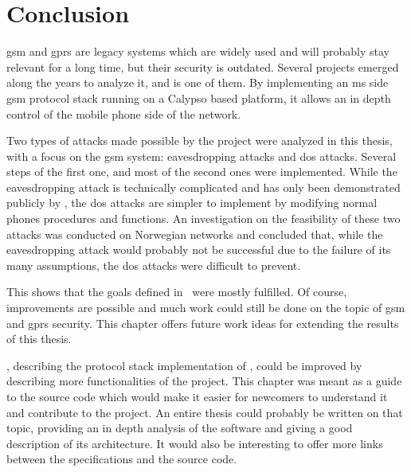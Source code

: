\chapter{Conclusion} \label{chap:conclusion}

  \gls{gsm} and \gls{gprs} are legacy systems which are widely used and
  will probably stay relevant for a long time, but their security is
  outdated. Several projects emerged along the years to analyze it, and
   is one of them. By implementing an \gls{ms} side
  \gls{gsm} protocol stack running on a Calypso based platform, it
  allows an in depth control of the mobile phone side of the network. 

  Two types of attacks made possible by the  project
  were analyzed in this thesis, with a focus on the \gls{gsm} system:
  eavesdropping attacks and \gls{dos} attacks. Several steps of the
  first one, and most of the second ones were implemented. While the
  eavesdropping attack is technically complicated and has only been
  demonstrated publicly by , the \gls{dos} attacks
  are simpler to implement by modifying normal phones procedures and
  functions. An investigation on the feasibility of these two attacks
  was conducted on Norwegian networks and concluded that, while the
  eavesdropping attack would probably not be successful due to the
  failure of its many
  assumptions, the \gls{dos} attacks were difficult to prevent.

  This shows that the goals defined in~ were mostly
  fulfilled. Of course, improvements are possible and much work
  could still be done on the topic of \gls{gsm} and \gls{gprs}
  security. This chapter offers future work ideas for extending the
  results of this thesis.

  , describing the protocol
  stack implementation of , could be improved by
  describing more functionalities of the project. This chapter was meant
  as a guide to the source code which would make it easier for newcomers
  to understand it and contribute to the project. An entire thesis could
  probably be written on that topic, providing an in depth analysis of
  the software and giving a good description of its architecture. It
  would also be interesting to offer more links between the
  specifications and the source code.

  \newpage

